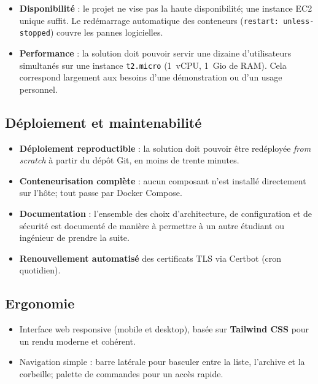 \begin{itemize}
  \item \textbf{Disponibilité} : le projet ne vise pas la haute
        disponibilité; une instance EC2 unique suffit. Le redémarrage
        automatique des conteneurs (\texttt{restart: unless-stopped})
        couvre les pannes logicielles.
  \item \textbf{Performance} : la solution doit pouvoir servir une
        dizaine d'utilisateurs simultanés sur une instance \texttt{t2.micro}
        (1~vCPU, 1~Gio de RAM). Cela correspond largement aux besoins
        d'une démonstration ou d'un usage personnel.
\end{itemize}

\subsection{Déploiement et maintenabilité}

\begin{itemize}
  \item \textbf{Déploiement reproductible} : la solution doit pouvoir
        être redéployée \emph{from scratch} à partir du dépôt Git, en
        moins de trente minutes.
  \item \textbf{Conteneurisation complète} : aucun composant n'est
        installé directement sur l'hôte; tout passe par Docker
        Compose.
  \item \textbf{Documentation} : l'ensemble des choix d'architecture,
        de configuration et de sécurité est documenté de manière à
        permettre à un autre étudiant ou ingénieur de prendre la suite.
  \item \textbf{Renouvellement automatisé} des certificats TLS via
        Certbot (cron quotidien).
\end{itemize}

\subsection{Ergonomie}

\begin{itemize}
  \item Interface web responsive (mobile et desktop), basée sur
        \textbf{Tailwind CSS} pour un rendu moderne et cohérent.
  \item Navigation simple : barre latérale pour basculer entre la
        liste, l'archive et la corbeille; palette de commandes pour
        un accès rapide.
\end{itemize}

